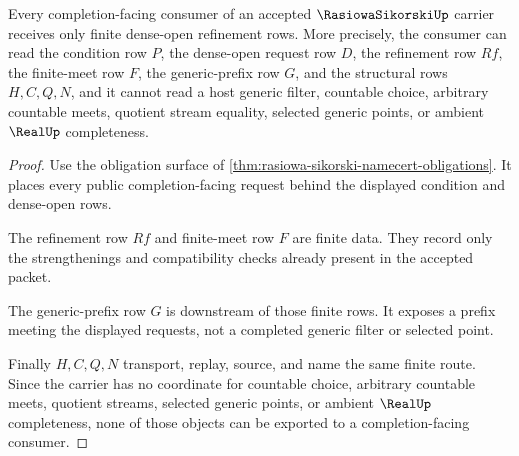 \begin{theorem}
\label{thm:rasiowa-sikorski-finite-dense-open-route}
Every completion-facing consumer of an accepted $\RasiowaSikorskiUp$ carrier receives only finite dense-open refinement rows. More precisely, the consumer can read the condition row $P$, the dense-open request row $D$, the refinement row $Rf$, the finite-meet row $F$, the generic-prefix row $G$, and the structural rows $H,C,Q,N$, and it cannot read a host generic filter, countable choice, arbitrary countable meets, quotient stream equality, selected generic points, or ambient $\RealUp$ completeness.
\end{theorem}
\begin{proof}
Use the obligation surface of \autoref{thm:rasiowa-sikorski-namecert-obligations}. It places every public completion-facing request behind the displayed condition and dense-open rows.

The refinement row $Rf$ and finite-meet row $F$ are finite data. They record only the strengthenings and compatibility checks already present in the accepted packet.

The generic-prefix row $G$ is downstream of those finite rows. It exposes a prefix meeting the displayed requests, not a completed generic filter or selected point.

Finally $H,C,Q,N$ transport, replay, source, and name the same finite route. Since the carrier has no coordinate for countable choice, arbitrary countable meets, quotient streams, selected generic points, or ambient $\RealUp$ completeness, none of those objects can be exported to a completion-facing consumer.
\end{proof}



